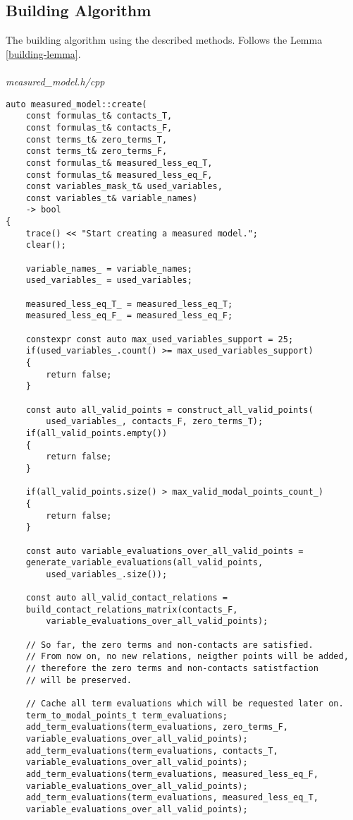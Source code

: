 \documentclass{article}
\begin{document}
	\subsection{Building Algorithm}
		The building algorithm using the described methods. Follows the Lemma \ref{building-lemma}.
\\
\\
\noindent
\textit{measured\_model.h/cpp}
\begin{lstlisting}
auto measured_model::create(
    const formulas_t& contacts_T,
    const formulas_t& contacts_F,
    const terms_t& zero_terms_T,
    const terms_t& zero_terms_F,
    const formulas_t& measured_less_eq_T,
    const formulas_t& measured_less_eq_F,
    const variables_mask_t& used_variables,
    const variables_t& variable_names)
    -> bool 
{
    trace() << "Start creating a measured model.";
    clear();

    variable_names_ = variable_names;
    used_variables_ = used_variables;

    measured_less_eq_T_ = measured_less_eq_T;
    measured_less_eq_F_ = measured_less_eq_F;

    constexpr const auto max_used_variables_support = 25;
    if(used_variables_.count() >= max_used_variables_support)
    {
        return false;
    }

    const auto all_valid_points = construct_all_valid_points(
		used_variables_, contacts_F, zero_terms_T);
    if(all_valid_points.empty())
    {
        return false;
    }

    if(all_valid_points.size() > max_valid_modal_points_count_)
    {
        return false;
    }

    const auto variable_evaluations_over_all_valid_points = 
	generate_variable_evaluations(all_valid_points,
		used_variables_.size());

    const auto all_valid_contact_relations =
	build_contact_relations_matrix(contacts_F, 
		variable_evaluations_over_all_valid_points);

    // So far, the zero terms and non-contacts are satisfied.
    // From now on, no new relations, neigther points will be added, 
    // therefore the zero terms and non-contacts satistfaction 
    // will be preserved.

    // Cache all term evaluations which will be requested later on.
    term_to_modal_points_t term_evaluations;
    add_term_evaluations(term_evaluations, zero_terms_F,
	variable_evaluations_over_all_valid_points);
    add_term_evaluations(term_evaluations, contacts_T,
	variable_evaluations_over_all_valid_points);
    add_term_evaluations(term_evaluations, measured_less_eq_F, 
	variable_evaluations_over_all_valid_points);
    add_term_evaluations(term_evaluations, measured_less_eq_T, 
	variable_evaluations_over_all_valid_points);


\end{lstlisting}
\end{document}
